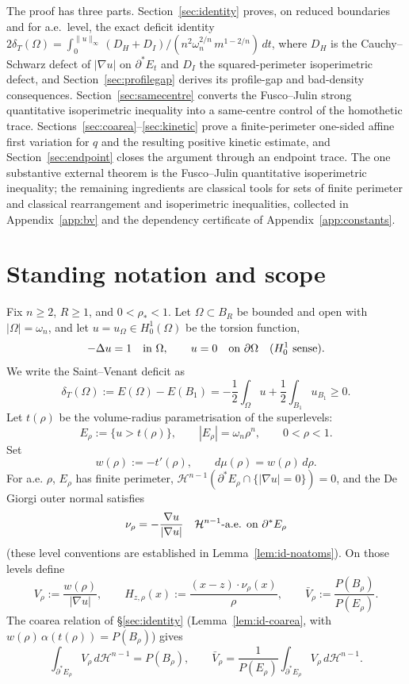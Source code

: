 \documentclass[11pt]{amsart}
\theoremstyle{definition}
\newcommand{\Om}{\Omega}
\newcommand{\dT}{\delta_T}
\newcommand{\rstar}{\rho_*}
\newcommand{\wt}{w}
\newcommand{\Hn}{\mathcal H^{n-1}}
\newcommand{\Per}{P}
\begin{document}
The proof has three parts.  Section~\ref{sec:identity} proves, on reduced
boundaries and for a.e.\ level, the exact deficit identity
\(2\dT(\Om)=\int_0^{\|u\|_\infty}(D_H+D_I)/(n^2\omega_n^{2/n}\,m^{1-2/n})\,dt\),
where \(D_H\) is the Cauchy--Schwarz defect of \(|\nabla u|\) on
\(\partial^*E_t\) and \(D_I\) the squared-perimeter isoperimetric defect, and
Section~\ref{sec:profilegap} derives its profile-gap and bad-density
consequences.  Section~\ref{sec:samecentre} converts the Fusco--Julin strong
quantitative isoperimetric inequality into a same-centre control of the
homothetic trace.  Sections~\ref{sec:coarea}--\ref{sec:kinetic} prove a
finite-perimeter one-sided affine first variation for \(q\) and the resulting
positive kinetic estimate, and Section~\ref{sec:endpoint} closes the argument
through an endpoint trace.  The one substantive external theorem is the
Fusco--Julin quantitative isoperimetric inequality; the remaining ingredients
are classical tools for sets of finite perimeter and classical
rearrangement and isoperimetric inequalities, collected in
Appendix~\ref{app:bv} and the dependency certificate of
Appendix~\ref{app:constants}.

\section{Standing notation and scope}\label{sec:notation}

Fix \(n\ge2\), \(R\ge1\), and \(0<\rstar<1\).  Let
\(\Om\subset B_R\) be bounded and open with \(|\Om|=\omega_n\), and let
\(u=u_\Om\in H^1_0(\Om)\) be the torsion function,
\[
   -\Delta u=1\quad\hbox{in }\Om,\qquad u=0\quad\hbox{on }\partial\Om
   \quad(H^1_0\hbox{ sense}).
\]
We write the Saint--Venant deficit as
\[
   \dT(\Om):=E(\Om)-E(B_1)
   =-\frac12\int_\Om u+\frac12\int_{B_1}u_{B_1}\ge0.
\]
Let \(t(\rho)\) be the volume-radius parametrisation of the superlevels:
\[
   E_\rho:=\{u>t(\rho)\},\qquad |E_\rho|=\omega_n\rho^n,
   \qquad 0<\rho<1.
\]
Set
\[
   \wt(\rho):=-t'(\rho),\qquad d\mu(\rho)=\wt(\rho)\,d\rho.
\]
For a.e. \(\rho\), \(E_\rho\) has finite perimeter, \(\Hn(\partial^*E_\rho
\cap\{|\nabla u|=0\})=0\), and the De Giorgi outer normal satisfies
\[
   \nu_\rho=-\frac{\nabla u}{|\nabla u|}
   \quad\Hn\hbox{-a.e. on }\partial^*E_\rho
\]
(these level conventions are established in
Lemma~\ref{lem:id-noatoms}).  On those levels define
\[
   V_\rho:=\frac{\wt(\rho)}{|\nabla u|},\qquad
   H_{z,\rho}(x):=\frac{(x-z)\cdot\nu_\rho(x)}{\rho},\qquad
   \bar V_\rho:=\frac{\Per(B_\rho)}{\Per(E_\rho)}.
\]
The coarea relation of \S\ref{sec:identity}
(Lemma~\ref{lem:id-coarea}, with \(\wt(\rho)\,\alpha(t(\rho))=\Per(B_\rho)\))
gives
\begin{equation}\label{eq:V-mean}
   \int_{\partial^*E_\rho} V_\rho\,d\Hn=\Per(B_\rho),
   \qquad
   \bar V_\rho=\frac1{\Per(E_\rho)}
       \int_{\partial^*E_\rho}V_\rho\,d\Hn .
\end{equation}
\end{document}
